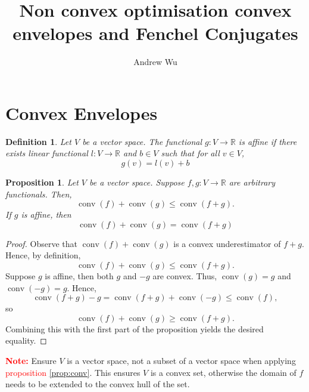 \documentclass[11pt]{article}
\title{Non convex optimisation convex envelopes and Fenchel Conjugates}
\author{Andrew Wu}
\newtheorem{definition}{Definition}
\newtheorem{proposition}{Proposition}
\DeclareMathOperator*{\conv}{conv}
\newcommand{\R}{\mathbb{R}}
\newcommand{\Prob}[1]{\mathscr{P}_{#1}}
\begin{document}
	
	\maketitle
	
	\begin{comment}
	\section{Problem}
	Let $X,Y$ be Hilbert spaces and suppose $f:X\times Y\to\R$ is a smooth convex function and  $g:X\times Y\to\R$ is non-convex. We want to solve the following problem, denoted by $\Prob{0}$
	\begin{equation*}
		\inf_{x,y\in X\times Y} f(x,y)
		\end{equation*}
	subject to the constraint 
	\[	g(x,y) \geq 0.
		\]
	\end{comment}
	\section{Convex Envelopes}
	\begin{definition}
		Let $V$ be a vector space. The functional $g:V\to\R$ is affine if there exists linear functional $l:V\to\R$ and $b\in V$ such that for all $v\in V$, 
		\[  g(v) = l(v) + b
		\]
	\end{definition}
	\begin{proposition}
		\label{prop:conv}
		Let $V$ be a vector space. Suppose $f,g:V\to\R$ are arbitrary functionals. Then, 
		\[  \conv(f) + \conv(g)\leq \conv(f+g).
		\]
		If $g$ is affine, then 
		\[  \conv(f) + \conv(g) = \conv(f + g)
		\]
	\end{proposition}
	
	\begin{proof}
		Observe that $\conv(f) + \conv(g)$ is a convex underestimator of $f + g$. Hence, by definition,
		\[  \conv(f) + \conv(g)\leq \conv(f+g).
		\]
		Suppose $g$ is affine, then both $g$ and $-g$ are convex. Thus, $\conv(g) = g$ and $\conv(-g)=g$. Hence,
		\[	\conv(f + g) - g = \conv(f+g) + \conv(-g) \leq \conv(f),
				\]
		so 
		\[	\conv(f) + \conv(g) \geq \conv(f + g).
				\]
		Combining this with the first part of the proposition yields the desired equality.
		\end{proof}
	
	\noindent \textcolor{red}{\textbf{Note:}} Ensure $V$ is a vector space, not a subset of a vector space when applying \textcolor{red}{proposition }\autoref{prop:conv}. This ensures $V$ is a convex set, otherwise the domain of $f$ needs to be extended to the convex hull of the set.
\end{document}

